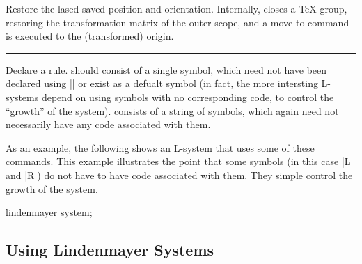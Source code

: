 \begin{command}{\pgfdeclarelindenmayersystem{}}
\begin{command}{\symbol{}}
\begin{command}{\pgflsystemrestorestate}
	Restore the lased saved position and orientation. Internally,
	\pgfname{} closes a \TeX-group, restoring the transformation 
	matrix of the outer scope, and a move-to command is executed to
	the (transformed) origin.
\end{command}
  

\end{command}

\begin{command}{\rule{\ttfamily\char`\{}}
  Declare a rule.  should consist of a single symbol, which
  need not have been declared using |\symbol| or exist as a defualt
  symbol (in fact, the more intersting L-systems depend on using
  symbols with no corresponding code, to control the ``growth'' of the
  system).
 	 consists of a string of symbols, which again need not
 	necessarily have any code associated with them.
 	
\end{command}

  As an example, the following shows an L-system that uses
  some of these commands. This example illustrates the point
  that some symbols (in this case |L| and |R|) do not have to 
  have code associated with them. They simple control the
  growth of the system.
  
\begin{codeexample}[pre={\expandafter\let\csname pgf@lsystem@Hilbert curve\endcsname=\relax}]
\tikz\draw[lindenmayer system={Hilbert curve, axiom=L, order=4, angle=90}]
  lindenmayer system;
\end{codeexample}


\end{command}

\subsection{Using Lindenmayer Systems}
